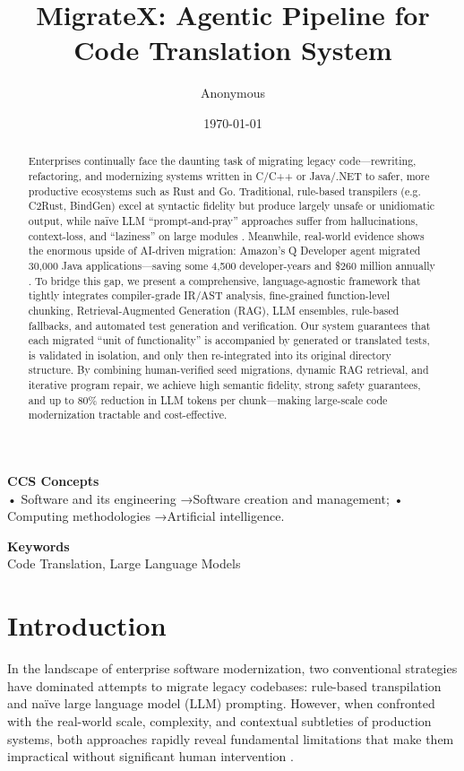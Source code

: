\documentclass[twocolumn]{article}
\title{\textbf{MigrateX: Agentic Pipeline for Code Translation System}}
\author{Anonymous}
\date{\today}
\begin{document}
\fontsize{9}{11}\selectfont
\maketitle
        \begin{abstract}
        Enterprises continually face the daunting task of migrating legacy code—rewriting, refactoring, and modernizing systems written in C/C++ or Java/.NET to safer, more productive ecosystems such as Rust and Go. Traditional, rule-based transpilers (e.g. C2Rust, BindGen) excel at syntactic fidelity but produce largely unsafe or unidiomatic output, while naïve LLM ``prompt-and-pray'' approaches suffer from hallucinations, context-loss, and ``laziness'' on large modules \cite{tang2023large}. Meanwhile, real-world evidence shows the enormous upside of AI-driven migration: Amazon's Q Developer agent migrated 30,000 Java applications—saving some 4,500 developer-years and \$260 million annually \cite{aws-genai-director}. To bridge this gap, we present a comprehensive, language-agnostic framework that tightly integrates compiler-grade IR/AST analysis, fine-grained function-level chunking, Retrieval-Augmented Generation (RAG), LLM ensembles, rule-based fallbacks, and automated test generation and verification. Our system guarantees that each migrated ``unit of functionality'' is accompanied by generated or translated tests, is validated in isolation, and only then re-integrated into its original directory structure. By combining human-verified seed migrations, dynamic RAG retrieval, and iterative program repair, we achieve high semantic fidelity, strong safety guarantees, and up to 80\% reduction in LLM tokens per chunk—making large-scale code modernization tractable and cost-effective.
        \end{abstract}

\vspace{1em}
        \noindent\textbf{CCS Concepts}\\
        • Software and its engineering →Software creation and management; • Computing methodologies →Artificial intelligence.
        
        \vspace{1em}
        \noindent\textbf{Keywords}\\
        Code Translation, Large Language Models

\begingroup
\section{Introduction}
In the landscape of enterprise software modernization, two conventional strategies have dominated attempts to migrate legacy codebases: rule-based transpilation and naïve large language model (LLM) prompting. However, when confronted with the real-world scale, complexity, and contextual subtleties of production systems, both approaches rapidly reveal fundamental limitations that make them impractical without significant human intervention \cite{llama3} \cite{claude} \cite{gemini}.
\end{document}
